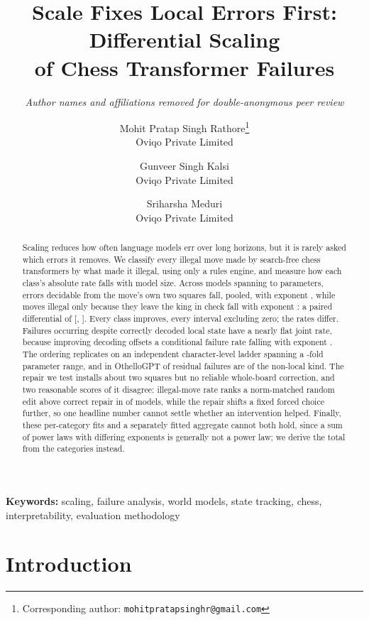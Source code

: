 \documentclass[11pt]{article}
\title{\bf Scale Fixes Local Errors First: Differential Scaling\\of Chess Transformer Failures}
\author{\normalsize\itshape Author names and affiliations removed for double-anonymous peer review}
\author{
    Mohit Pratap Singh Rathore\thanks{Corresponding author:
      \texttt{mohitpratapsinghr@gmail.com}}\\ \small Oviqo Private Limited
    \and
    Gunveer Singh Kalsi\\ \small Oviqo Private Limited
    \and
    Sriharsha Meduri\\ \small Oviqo Private Limited
  }
\date{}
\begin{document}
\maketitle

\begin{abstract}
Scaling reduces how often language models err over long horizons, but it is rarely
asked which errors it removes. We classify every illegal move made by search-free
chess transformers by what made it illegal, using only a rules engine, and measure
how each class's absolute rate falls with model size. Across
 models spanning  to  parameters, errors decidable
from the move's own two squares fall, pooled, with exponent , while
moves illegal only because they leave the king in check fall with exponent
: a paired differential of  [,
]. Every
class improves, every interval excluding zero; the rates differ. Failures occurring despite
correctly decoded local state have a nearly flat joint rate, because improving
decoding offsets a conditional failure rate falling with exponent . The
ordering replicates on an independent character-level ladder spanning a
-fold parameter range, and in OthelloGPT  of  residual
failures are of the non-local kind. The repair we test installs about two
squares but no reliable whole-board correction, and two reasonable scores of it
disagree:
illegal-move rate ranks a norm-matched random edit above correct repair in
 of  models, while the repair shifts a fixed forced choice
further, so one headline number cannot settle whether an intervention helped.
Finally, these per-category fits and a separately fitted aggregate cannot both
hold, since a sum of power laws with differing exponents is generally not a power
law; we derive the total from the categories instead.
\end{abstract}

\noindent\textbf{Keywords:} scaling, failure analysis, world models, state
tracking, chess, interpretability, evaluation methodology

\section{Introduction}
\end{document}
